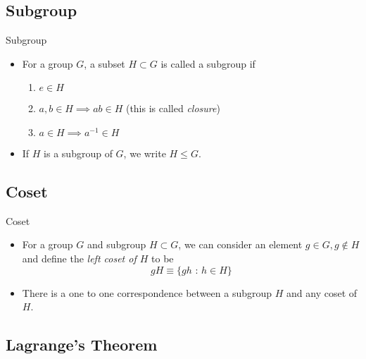 \documentclass[11pt]{article}
\begin{document}
\vskip 1cm
\subsection{Subgroup}

\vskip 0.5cm
\begin{mathdefinitionbox}{Subgroup}
  \vskip 0.5cm
  \begin{itemize}
    \item   For a group $G$, a subset $H \subset G$ is called a subgroup if 
    \begin{enumerate}[label=(\alph*)]
      \item $e \in H$
      \item $a, b \in H \implies ab \in H$ (this is called \emph{closure})
      \item $a \in H \implies a^{-1} \in H$ 
    \end{enumerate}

    \item If $H$ is a subgroup of $G$, we write $H \leq G$.
  \end{itemize}
\end{mathdefinitionbox}



\vskip 1cm
\subsection{Coset}

\vskip 0.5cm
\begin{mathdefinitionbox}{Coset}
\vskip 0.5cm
  \begin{itemize}
    \item For a group $G$ and subgroup $H \subset G$, we can consider an element $g \in G, g \not\in H$ and define the \emph{left coset of $H$} to be
    \[ gH \equiv \{ gh \text{ : } h \in H \} \]

    \item There is a one to one correspondence between a subgroup $H$ and any coset of $H$.
  \end{itemize}
\end{mathdefinitionbox}

\vskip 1cm
\subsection{Lagrange's Theorem}
\end{document}
